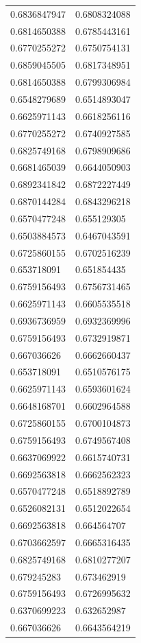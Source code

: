 \begin{longtable}{@{}ll@{}}
	0.6836847947 & 0.6808324088 \\
	0.6814650388 & 0.6785443161 \\
	0.6770255272 & 0.6750754131 \\
	0.6859045505 & 0.6817348951 \\
	0.6814650388 & 0.6799306984 \\
	0.6548279689 & 0.6514893047 \\
	0.6625971143 & 0.6618256116 \\
	0.6770255272 & 0.6740927585 \\
	0.6825749168 & 0.6798909686 \\
	0.6681465039 & 0.6644050903 \\
	0.6892341842 & 0.6872227449 \\
	0.6870144284 & 0.6843296218 \\
	0.6570477248 & 0.655129305  \\
	0.6503884573 & 0.6467043591 \\
	0.6725860155 & 0.6702516239 \\
	0.653718091  & 0.651854435  \\
	0.6759156493 & 0.6756731465 \\
	0.6625971143 & 0.6605535518 \\
	0.6936736959 & 0.6932369996 \\
	0.6759156493 & 0.6732919871 \\
	0.667036626  & 0.6662660437 \\
	0.653718091  & 0.6510576175 \\
	0.6625971143 & 0.6593601624 \\
	0.6648168701 & 0.6602964588 \\
	0.6725860155 & 0.6700104873 \\
	0.6759156493 & 0.6749567408 \\
	0.6637069922 & 0.6615740731 \\
	0.6692563818 & 0.6662562323 \\
	0.6570477248 & 0.6518892789 \\
	0.6526082131 & 0.6512022654 \\
	0.6692563818 & 0.664564707  \\
	0.6703662597 & 0.6665316435 \\
	0.6825749168 & 0.6810277207 \\
	0.679245283  & 0.673462919  \\
	0.6759156493 & 0.6726995632 \\
	0.6370699223 & 0.632652987  \\
	0.667036626  & 0.6643564219 \\

\end{longtable}
